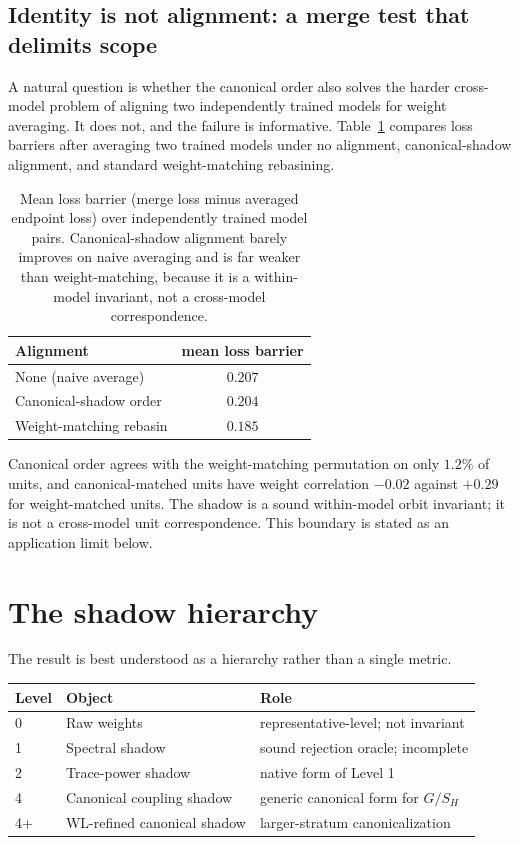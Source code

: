 \documentclass[11pt]{article}
\begin{document}
\subsection{Identity is not alignment: a merge test that delimits scope}

A natural question is whether the canonical order also solves the harder cross-model problem of aligning two independently trained models for weight averaging. It does not, and the failure is informative. Table~\ref{tab:merge} compares loss barriers after averaging two trained models under no alignment, canonical-shadow alignment, and standard weight-matching rebasining.

\begin{table}[h]
\centering
\caption{Mean loss barrier (merge loss minus averaged endpoint loss) over independently trained model pairs. Canonical-shadow alignment barely improves on naive averaging and is far weaker than weight-matching, because it is a within-model invariant, not a cross-model correspondence.}
\label{tab:merge}
\begin{tabular}{lc}
\toprule
Alignment & mean loss barrier\\
\midrule
None (naive average) & $0.207$\\
Canonical-shadow order & $0.204$\\
Weight-matching rebasin & $0.185$\\
\bottomrule
\end{tabular}
\end{table}

Canonical order agrees with the weight-matching permutation on only $1.2\%$ of units, and canonical-matched units have weight correlation $-0.02$ against $+0.29$ for weight-matched units. The shadow is a sound within-model orbit invariant; it is not a cross-model unit correspondence. This boundary is stated as an application limit below.

\section{The shadow hierarchy}

The result is best understood as a hierarchy rather than a single metric.

\begin{center}
\begin{tabular}{lll}
\toprule
Level & Object & Role\\
\midrule
0 & Raw weights & representative-level; not invariant\\
1 & Spectral shadow & sound rejection oracle; incomplete\\
2 & Trace-power shadow & native form of Level 1\\
4 & Canonical coupling shadow & generic canonical form for $G/S_H$\\
4+ & WL-refined canonical shadow & larger-stratum canonicalization\\
\bottomrule
\end{tabular}
\end{center}
\end{document}
